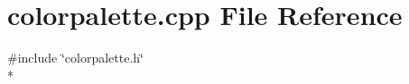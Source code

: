 \section{colorpalette.\+cpp File Reference}
\label{bk3_2colorpalette_8cpp}
{\ttfamily \#include \char`\"{}colorpalette.\+h\char`\"{}}\\*
